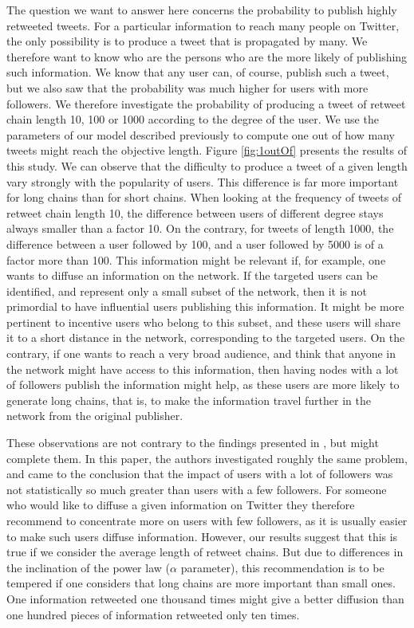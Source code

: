 \documentclass[conference]{IEEEtran}
\begin{document}
The question we want to answer here concerns the probability to publish highly retweeted tweets. For a particular information to reach many people on Twitter, the only possibility is to produce a tweet that is propagated by many. We therefore want to know who are the persons who are the more likely of publishing such information. We know that any user can, of course, publish such a tweet, but we also saw that the probability was much higher for users with more followers. We therefore investigate the probability of producing a tweet of retweet chain length 10, 100 or 1000 according to the degree of the user. We use the parameters of our model described previously to compute one out of how many tweets might reach the objective length. Figure \ref{fig:1outOf} presents the results of this study. We can observe that the difficulty to produce a tweet of a given length vary strongly with the popularity of users. This difference is far more important for long chains than for short chains. When looking at the frequency of tweets of retweet chain length 10, the difference between users of different degree stays always smaller than a factor 10. On the contrary, for tweets of length 1000, the difference between a user followed by 100, and a user followed by 5000 is of a factor more than 100.
This information might be relevant if, for example, one wants to diffuse an information on the network. If the targeted users can be identified, and represent only a small subset of the network, then it is not primordial to have influential users publishing this information. It might be more pertinent to incentive users who belong to this subset, and these users will share it to a short distance in the network, corresponding to the targeted users. On the contrary, if one wants to reach a very broad audience, and think that anyone in the network might have access to this information, then having nodes with a lot of followers publish the information might help, as these users are more likely to generate long chains, that is, to make the information travel further in the network from the original publisher.

These observations are not contrary to the findings presented in \cite{bakshy2011everyone}, but might complete them. In this paper, the authors  investigated roughly the same problem, and came to the conclusion that the impact of users with a lot of followers was not statistically so much greater than users with a few followers. For someone who would like to diffuse a given information on Twitter they therefore recommend to concentrate more on users with few followers, as it is usually easier to make such users diffuse information. However, our results suggest that this is true if we consider the average length of retweet chains. But due to differences in the inclination of the power law ($\alpha$ parameter), this recommendation is to be tempered if one considers that long chains are more important than small ones. One information retweeted one thousand times might give a better diffusion than one hundred pieces of information retweeted only ten times.
\end{document}
